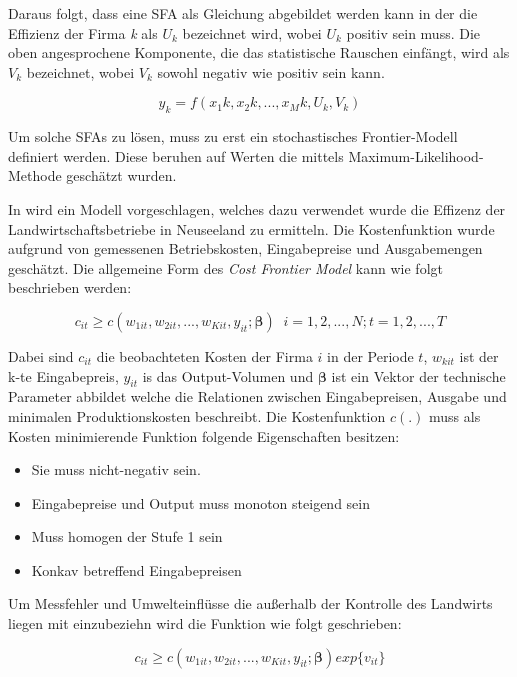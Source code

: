 Daraus folgt, dass eine SFA als Gleichung abgebildet werden kann in der die Effizienz der Firma \textit{k} als $U_k$ bezeichnet wird, wobei $U_k$ positiv sein muss. Die oben angesprochene Komponente, die das statistische Rauschen einfängt, wird als $V_k$ bezeichnet, wobei $V_k$ sowohl negativ wie positiv sein kann.\cite{jour:Cullinane2006}

\begin{equation}\label{eq:sfadef}
	y_k = f(x_1k,x_2k,...,x_Mk,U_k,V_k)
\end{equation}

Um solche SFAs zu lösen, muss zu erst ein stochastisches Frontier-Modell definiert werden. Diese beruhen auf Werten die mittels Maximum-Likelihood-Methode geschätzt wurden.

In \cite{conf:Jian2013} wird ein Modell vorgeschlagen, welches dazu verwendet wurde die Effizenz der Landwirtschaftsbetriebe in Neuseeland zu ermitteln. Die Kostenfunktion wurde aufgrund von gemessenen Betriebskosten, Eingabepreise und Ausgabemengen geschätzt. Die allgemeine Form des \textit{Cost Frontier Model} kann wie folgt beschrieben werden:

\begin{equation}
	c_{it} \geq c(w_{1it}, w_{2it},...,w_{Kit},y_{it};\boldsymbol{\beta}) \;\; i=1,2,...,N;t=1,2,...,T
\end{equation}

Dabei sind $c_{it}$ die beobachteten Kosten der Firma $i$ in der Periode $t$, $w_{kit}$ ist der k-te Eingabepreis, $y_{it}$ is das Output-Volumen und $\boldsymbol{\beta}$ ist ein Vektor der technische Parameter abbildet welche die Relationen zwischen Eingabepreisen, Ausgabe und minimalen Produktionskosten beschreibt. Die Kostenfunktion $c(.)$ muss als Kosten minimierende Funktion folgende Eigenschaften besitzen:
\begin{itemize}
	\item Sie muss nicht-negativ sein.
	\item Eingabepreise und Output muss monoton steigend sein
	\item Muss homogen der Stufe 1 sein
	\item Konkav betreffend Eingabepreisen
\end{itemize}

Um Messfehler und Umwelteinflüsse die außerhalb der Kontrolle des Landwirts liegen mit einzubeziehn wird die Funktion wie folgt geschrieben:

\begin{equation}
	c_{it} \geq c(w_{1it},w_{2it},...,w_{Kit},y_{it};\boldsymbol{\beta})exp\{v_{it}\}
\end{equation}

